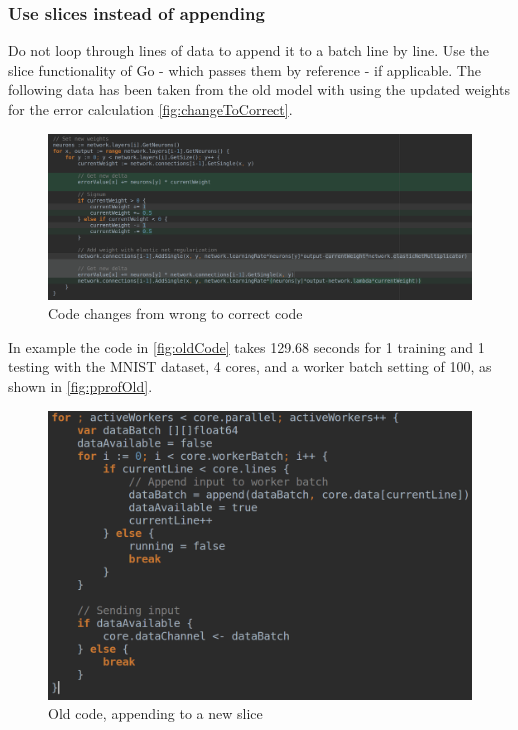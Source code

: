 \documentclass[11pt]{article}
\begin{document}
\subsubsection{Use slices instead of appending}
Do not loop through lines of data to append it to a batch line by line. Use the slice functionality of Go - which passes them by reference - if applicable. The following data has been taken from the old model with using the updated weights for the error calculation \autoref{fig:changeToCorrect}.
\begin{figure}[H]
	\includegraphics[width=1.0\textwidth]{./Data/Final/Images/changeToCorrect.png}
	\vspace{-1em}
	\caption{Code changes from wrong to correct code}
	\vspace{-0.5em}
	\label{fig:changeToCorrect}
\end{figure}

In example the code in \autoref{fig:oldCode} takes 129.68 seconds for 1 training and 1 testing with the MNIST dataset, 4 cores, and a worker batch setting of 100, as shown in \autoref{fig:pprofOld}.

\begin{figure}[H]
	\centering
	\includegraphics[width=1.0\textwidth]{./Data/WrongMath/Images/oldcode.png}
	\vspace{-1em}
	\caption{Old code, appending to a new slice}
	\vspace{-0.5em}
	\label{fig:oldCode}
\end{figure}
\end{document}
